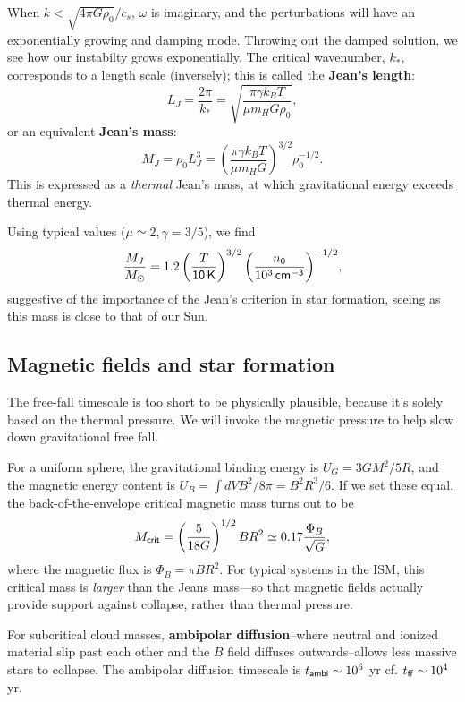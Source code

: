 \documentclass{tufte-handout}
\renewcommand{\textbf}[1]{{\bf \textcolor{dark-gray}{#1}}}
\renewcommand{\rm}{\sf}
\begin{document}
When $k < \sqrt{4\pi G\rho_0}/c_s$, $\omega$ is imaginary, and the perturbations will have an exponentially growing and damping mode. Throwing out the damped solution, we see how our instabilty grows exponentially. The critical wavenumber, $k_*$, corresponds to a length scale (inversely); this is called the \textbf{Jean's length}:
\begin{equation}
L_J = \frac{2\pi}{k_{*}} = \sqrt{\frac{\pi \gamma k_B T}{\mu m_H G\rho_0}},
\end{equation}
or an equivalent \textbf{Jean's mass}:
\begin{equation}
M_J = \rho_0 L_J^3 = \left (\frac{\pi \gamma k_B T}{\mu m_H G}\right )^{3/2} \rho_0^{-1/2}.
\end{equation}
This is expressed as a \textit{thermal} Jean's mass, at which gravitational energy exceeds thermal energy.

Using typical values ($\mu \simeq 2, \gamma = 3/5$), we find
\[\frac{M_J}{M_\odot} = 1.2 \left (\frac{T}{\rm 10\, K}\right )^{3/2} \bigg (\frac{n_0}{10^3\rm\, cm^{-3}}\bigg )^{-1/2},\]
suggestive of the importance of the Jean's criterion in star formation, seeing as this mass is close to that of our Sun.


\subsection{Magnetic fields and star formation}
The free-fall timescale is too short to be physically plausible, because it's solely based on the thermal pressure. We will invoke the magnetic pressure to help slow down gravitational free fall.

For a uniform sphere, the gravitational binding energy is $U_G = 3GM^2/5R$, and the magnetic energy content is $U_B = \int dV B^2/8\pi = B^2R^3/6$. If we set these equal, the back-of-the-envelope critical magnetic mass turns out to be
\[M_{\rm crit} = \left (\frac{5}{18 G}\right )^{1/2} BR^2 \simeq 0.17 \frac{\Phi_B}{\sqrt{G}},\]
where the magnetic flux is $\Phi_B = \pi BR^2$. For typical systems in the ISM, this critical mass is \textit{larger} than the Jeans mass---so that magnetic fields actually provide support against collapse, rather than thermal pressure.

For subcritical cloud masses, \textbf{ambipolar diffusion}--where neutral and ionized material slip past each other and the $B$ field diffuses outwards--allows less massive stars to collapse. The ambipolar diffusion timescale is $t_{\rm ambi} \sim 10^6$ yr cf. $t_{\rm ff}\sim 10^4$ yr.
\end{document}
